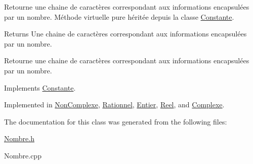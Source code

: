 \-Retourne une chaine de caractères correspondant aux informations encapsulées par un nombre. \-Méthode virtuelle pure héritée depuis la classe \hyperlink{classConstante}{\-Constante}. 

\begin{DoxyReturn}{\-Returns}
\-Une chaine de caractères correspondant aux informations encapsulées par un nombre.
\end{DoxyReturn}
\-Retourne une chaine de caractères correspondant aux informations encapsulées par un nombre. 

\-Implements \hyperlink{classConstante_ad5ea6850196ee9f86b74c74009a87ab1}{\-Constante}.



\-Implemented in \hyperlink{classNonComplexe_abae1947a8f9f582f94d5e791ce4624d6}{\-Non\-Complexe}, \hyperlink{classRationnel_a41bc89d21ce161818f67ccfe296766c0}{\-Rationnel}, \hyperlink{classEntier_aa960356dfeae8af6dfa2cd25136a1a6f}{\-Entier}, \hyperlink{classReel_a990e8324822ba3dbc64fc7ff727411e2}{\-Reel}, and \hyperlink{classComplexe_a327fd83ec9743fb43c5d47831d8ed45c}{\-Complexe}.



\-The documentation for this class was generated from the following files\-:\begin{DoxyCompactItemize}
\item 
\hyperlink{Nombre_8h}{\-Nombre.\-h}\item 
\-Nombre.\-cpp\end{DoxyCompactItemize}
